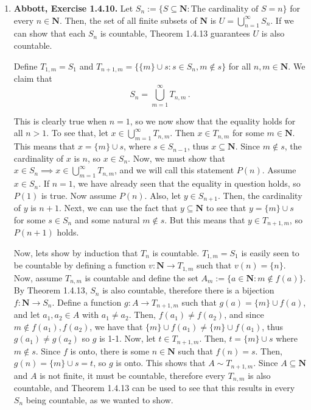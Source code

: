 \documentclass{article}
\newcommand{\N}{\mathbf{N}}
\newcommand{\exc}[2][Abbott]{\item \textbf{#1, Exercise #2.}}
\begin{document}
\begin{enumerate}
	\exc{1.4.10}
	Let $S_n := \{S \subseteq \N : \text{The cardinality of } S = n\}$ for every $n \in \N$. Then, the set of all finite subsets of $\N$ is $U = \bigcup_{n=1}^\infty S_n$. If we can show that each $S_n$ is countable, Theorem 1.4.13 guarantees $U$ is also countable.
				      	          
	Define $T_{1,m} = S_1$ and $T_{n+1,m} = \{\{m\} \cup s : s \in S_n, m \notin s\}$ for all $n, m \in \N$. We claim that \begin{equation*}
	S_n = \bigcup_{m=1}^{\infty} T_{n,m} \, .
	\end{equation*}
					    
	This is clearly true when $n = 1$, so we now show that the equality holds for all $n > 1$. To see that, let $x \in \bigcup_{m=1}^{\infty} T_{n,m}$. Then $x \in T_{n, m}$ for some $m \in \N$. This means that $x = \{m\} \cup s$, where $s \in S_{n-1}$, thus $x \subseteq \N$. Since $m \notin s$, the cardinality of $x$ is $n$, so $x \in S_n$. Now, we must show that $x \in S_n \implies x \in \bigcup_{m=1}^{\infty} T_{n,m}$, and we will call this statement $P(n)$. Assume $x \in S_n$. If $n = 1$, we have already seen that the equality in question holds, so $P(1)$ is true. Now assume $P(n)$. Also, let $y \in S_{n+1}$. Then, the cardinality of $y$ is $n+1$. Next, we can use the fact that $y \subseteq \N$ to see that $y = \{m\} \cup s$ for some $s \in S_n$ and some natural $m \notin s$. But this means that $y \in T_{n+1, m}$, so $P(n+1)$ holds.
					    
	Now, lets show by induction that $T_n$ is countable. $T_{1,m} = S_1$ is easily seen to be countable by defining a function $v : \N \rightarrow T_{1,m} $ such that $v(n) = \{n\}$. Now, assume $T_{n,m}$ is countable and define the set $A_m := \{a \in \N : m \notin f(a)\}$. By Theorem 1.4.13, $S_n$ is also countable, therefore there is a bijection $f : \N \rightarrow S_n$. Define a function $g : A\rightarrow T_{n+1, m}$ such that $g(a) = \{m\} \cup f(a)$, and let $a_1, a_2 \in A$ with $a_1 \neq a_2$. Then, $f(a_1) \neq f(a_2)$, and since $m \notin f(a_1), f(a_2)$, we have that $\{m\} \cup f(a_1) \neq \{m\} \cup f(a_1)$, thus $g(a_1) \neq g(a_2)$ so $g$ is 1-1. Now, let $t \in T_{n+1, m}$. Then, $t = \{m\} \cup s$ where $m \notin s$. Since $f$ is onto, there is some $n \in \N$ such that $f(n) = s$. Then, $g(n) = \{m\} \cup s = t$, so $g$ is onto. This shows that $A \sim T_{n+1, m}$. Since $A \subseteq \N$ and $A$ is not finite, it must be countable, therefore every $T_{n, m}$ is also countable, and Theorem 1.4.13 can be used to see that this results in every $S_n$ being countable, as we wanted to show.
					    

\end{enumerate}
\end{document}

